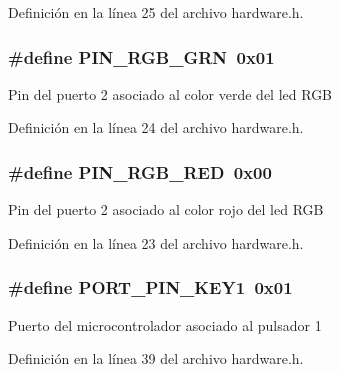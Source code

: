 Definición en la línea 25 del archivo hardware.\+h.

\subsubsection[{\texorpdfstring{P\+I\+N\+\_\+\+R\+G\+B\+\_\+\+G\+RN}{PIN_RGB_GRN}}]{\setlength{\rightskip}{0pt plus 5cm}\#define P\+I\+N\+\_\+\+R\+G\+B\+\_\+\+G\+RN~0x01}\hypertarget{group__hardware_ga298bb5d50ab2ba7b00df1c59087de286}{}\label{group__hardware_ga298bb5d50ab2ba7b00df1c59087de286}
Pin del puerto 2 asociado al color verde del led R\+GB 

Definición en la línea 24 del archivo hardware.\+h.

\subsubsection[{\texorpdfstring{P\+I\+N\+\_\+\+R\+G\+B\+\_\+\+R\+ED}{PIN_RGB_RED}}]{\setlength{\rightskip}{0pt plus 5cm}\#define P\+I\+N\+\_\+\+R\+G\+B\+\_\+\+R\+ED~0x00}\hypertarget{group__hardware_gaf3069b94e5b50d3558f6c36dd2e7ab15}{}\label{group__hardware_gaf3069b94e5b50d3558f6c36dd2e7ab15}
Pin del puerto 2 asociado al color rojo del led R\+GB 

Definición en la línea 23 del archivo hardware.\+h.

\subsubsection[{\texorpdfstring{P\+O\+R\+T\+\_\+\+P\+I\+N\+\_\+\+K\+E\+Y1}{PORT_PIN_KEY1}}]{\setlength{\rightskip}{0pt plus 5cm}\#define P\+O\+R\+T\+\_\+\+P\+I\+N\+\_\+\+K\+E\+Y1~0x01}\hypertarget{group__hardware_gafe1bf3da61040955deda9703ee539687}{}\label{group__hardware_gafe1bf3da61040955deda9703ee539687}
Puerto del microcontrolador asociado al pulsador 1 

Definición en la línea 39 del archivo hardware.\+h.

